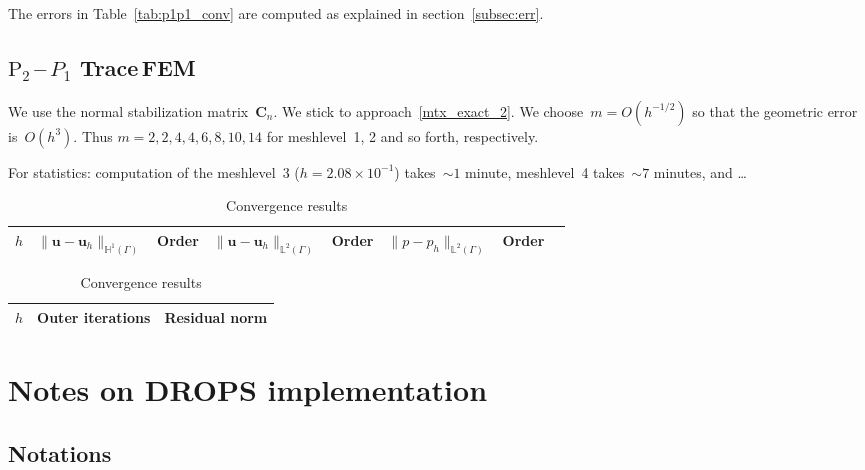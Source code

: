 \documentclass[12pt]{article}
\newcommand{\vect}[1]{\boldsymbol{\mathbf{#1}}}
\newcommand{\LTwoSpace}[1][\Gamma]{{\mathbb L^2\left({#1}\right)}}
\newcommand{\HOneSpace}[1][\Gamma]{{\mathbb H^1\left({#1}\right)}}
\begin{document}
The errors in Table~\ref{tab:p1p1_conv} are computed as explained in section~\ref{subsec:err}.

\clearpage

\subsection{$\text{P}_2$\,--\,$P_1$ Trace\,FEM}

We use the normal stabilization matrix~$\vect C_n$. We stick to approach~\eqref{mtx_exact_2}. We choose~$m = O(h^{-1/2})$ so that the geometric error is~$O(h^3)$. Thus $m = 2, 2, 4, 4, 6, 8, 10, 14$ for meshlevel~1, 2 and so forth, respectively.

For statistics: computation of the meshlevel~3 ($h = 2.08\times10^{-1}$) takes~${\sim}1$ minute, meshlevel~4 takes~${\sim}7$ minutes, and \dots

\begin{table}[h!]
	\centering\small
	\caption{Convergence results}
	\label{tab:p2p1_conv}
	\begin{subtable}{1.\linewidth}\centering
		\begin{tabular}[1.3]{|c|c||c|c||c|c||c|c|}
			\hline
			$h$ & $\|\vect u - \vect u_h\|_{\HOneSpace}$ & Order & $\|\vect u - \vect u_h\|_{\LTwoSpace}$ & Order & $\|p - p_h\|_{\LTwoSpace}$ & Order \\
			\hline
			
		\end{tabular}
	\end{subtable}
	\vskip 4mm	
	\begin{subtable}{1.\linewidth}\centering
		\begin{tabular}[1.3]{|c|c|c|}
			\hline
			$h$ & Outer iterations & Residual norm \\
			\hline
			
		\end{tabular}
	\end{subtable}
\end{table}

\section{Notes on DROPS implementation}

\subsection{Notations}\label{subsec:not}
\end{document}
